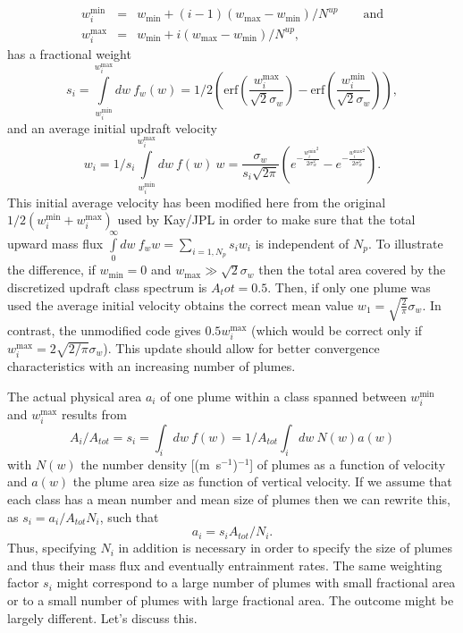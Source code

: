 \documentclass[dvipdfmx,a4paper,10pt]{article}
\begin{document}
\begin{eqnarray}
 w_i^{\mathrm{min}}&=&w_{\mathrm{min}}+(i-1)(w_{\mathrm{max}}-w_{\mathrm{min}})/N^{up} \qquad\mathrm{and}\\
 w_i^{\mathrm{max}}&=&w_{\mathrm{min}}+i(w_{\mathrm{max}}-w_{\mathrm{min}})/N^{up},
\end{eqnarray}
has a fractional weight
\begin{equation}
 s_i =\int\limits_{w_i^{\mathrm{min}}}^{w_i^{\mathrm{max}}} dw~f_w(w)=1/2(\mathrm{erf}(\frac{w_i^{\mathrm{max}}}{\sqrt{2}\sigma_w}) - \mathrm{erf}(\frac{w_i^{\mathrm{min}}}{\sqrt{2}\sigma_w})),
\end{equation}
and an average initial updraft velocity
\begin{equation}
 w_i =  1/s_i\int\limits_{w_i^{\mathrm{min}}}^{w_i^{\mathrm{max}}} dw~f(w)~ w =\frac{\sigma_w}{s_i \sqrt{2 \pi }} (e^{-\frac{{w_i^{\mathrm{min}}}^2}{2 \sigma_w^2}}- e^{-\frac{{w_i^{\mathrm{max}}}^2}{2 \sigma_w^2}}).
\end{equation}
{\color{blue} This initial average velocity has been modified here from the original $1/2(w_i^{\mathrm{min}}+w_i^{\mathrm{max}})$ used by Kay/JPL in order to make sure that the total upward mass flux $\int\limits_0^{\infty} dw~f_w w = \sum_{i=1,N_p} s_i w_i $ is independent of $N_p$. To illustrate the difference, if $w_{\mathrm{min}}=0$ and $w_{\mathrm{max}}\gg\sqrt{2}\sigma_w$ then the total area covered by the discretized updraft class spectrum is $A_tot=0.5$. Then, if only one plume was used the average initial velocity obtains the correct mean value $w_1=\sqrt{\frac{2}{\pi}} \sigma_w$. In contrast, the unmodified code gives $0.5 w_i^{\mathrm{max}}$ (which would be correct only if $w_i^{\mathrm{max}}=2\sqrt{2/\pi}\sigma_w$). This update should allow for better convergence characteristics with an increasing number of plumes.} 


The actual physical area $a_i$ of one plume within a class spanned between $w_i^{\mathrm{min}}$ and $w_i^{\mathrm{max}}$ results from 
\begin{equation}
A_i/A_{tot} = s_i = \int_i dw~f(w) = 1/A_{tot} \int_i dw~N(w)a(w) 
\end{equation}
with $N(w)$ the number density [(m~s$^{-1}$)$^{-1}$] of plumes as a function of velocity and $a(w)$ the plume area size as function of vertical velocity. If we assume that each class has a mean number and mean size of plumes then we can rewrite this, as $ s_i=a_i/A_{tot} N_i$, such that 
\begin{equation}
 a_i= s_i A_{tot}/N_i.
\end{equation}
{\color{blue}Thus, specifying $N_i$ in addition is necessary in order to specify the size of plumes and thus their mass flux and eventually entrainment rates. The same weighting factor $s_i$ might correspond to a large number of plumes with small fractional area or to a small number of plumes with large fractional area. The outcome might be largely different. Let's discuss this.}
\end{document}
